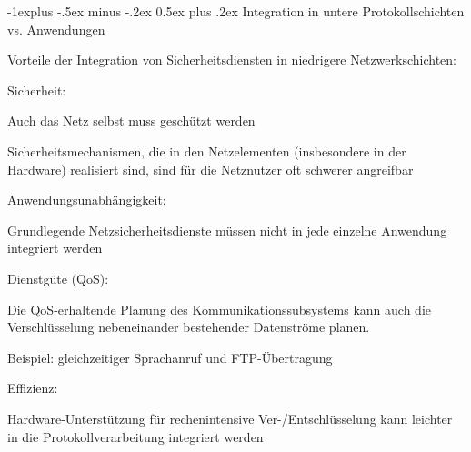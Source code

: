 \documentclass[a4paper]{article}
\makeatletter
\renewcommand{\subsection}{\@startsection{subsection}{2}{0mm}%
 {-1explus -.5ex minus -.2ex}%
 {0.5ex plus .2ex}%
 {\normalfont\normalsize\bfseries}}
\makeatother
\begin{document}
\begin{multicols}{3}
      \subsection{Integration in untere Protokollschichten vs. Anwendungen}
      \begin{itemize*}
            \item Vorteile der Integration von Sicherheitsdiensten in niedrigere Netzwerkschichten:
            \begin{itemize*}
                  \item Sicherheit:
                  \begin{itemize*}
                        \item Auch das Netz selbst muss geschützt werden
                        \item Sicherheitsmechanismen, die in den Netzelementen (insbesondere in der Hardware) realisiert sind, sind für die Netznutzer oft schwerer angreifbar
                  \end{itemize*}
                  \item Anwendungsunabhängigkeit:
                  \begin{itemize*}
                        \item Grundlegende Netzsicherheitsdienste müssen nicht in jede einzelne Anwendung integriert werden
                  \end{itemize*}
                  \item Dienstgüte (QoS):
                  \begin{itemize*}
                        \item Die QoS-erhaltende Planung des Kommunikationssubsystems kann auch die Verschlüsselung nebeneinander bestehender Datenströme planen.
                        \item Beispiel: gleichzeitiger Sprachanruf und FTP-Übertragung
                  \end{itemize*}
                  \item Effizienz:
                  \begin{itemize*}
                        \item Hardware-Unterstützung für rechenintensive Ver-/Entschlüsselung kann leichter in die Protokollverarbeitung integriert werden
                  \end{itemize*}
            \end{itemize*}
      \end{itemize*}


\end{multicols}
\end{document}
